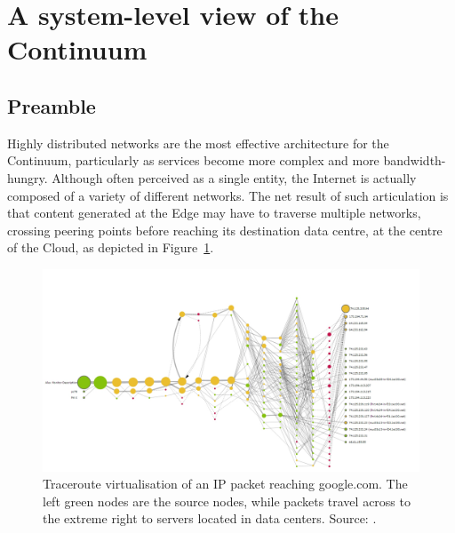 \section{A system-level view of the Continuum}
\label{sec:technicals}

\subsection{Preamble}
Highly distributed networks are the most effective architecture for the Continuum, particularly as services become more complex and more bandwidth-hungry. Although often perceived as a single entity, the Internet is actually composed of a variety of different networks. 
The net result of such articulation is that content generated at the Edge may have to traverse multiple networks, crossing peering points before reaching its destination data centre, at the centre of the Cloud, as depicted in Figure~\ref{fig:traceroute}.

\begin{figure}[ht]
\centering
\includegraphics[width=\columnwidth]{figures/traceroute}
\caption{Traceroute virtualisation of an IP packet reaching google.com. The left green nodes are the source nodes, while packets travel across to the extreme right to servers located in data centers. Source: \cite{traceroute-google}.}
\label{fig:traceroute}
\end{figure}


